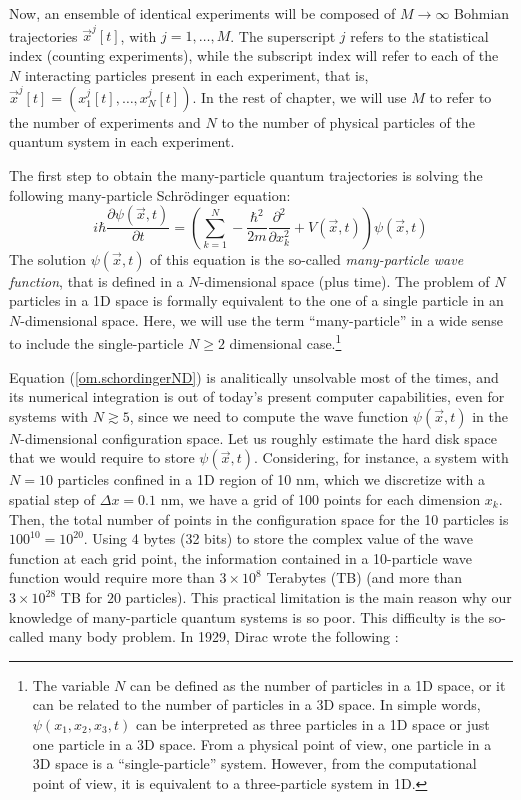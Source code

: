 \documentclass[nofootinbib, secnumarabic, amsmath, nobibnotes,10pt,aps,pra]{revtex4-1}
\newcommand{\Eref}[1]{Equation (\ref{#1})}
\begin{document}
Now, an ensemble of identical experiments  will be composed of $M\rightarrow\infty$
Bohmian trajectories $\vec{x}^j[t]$, with $j = 1,\ldots,M$. The superscript
$j$ refers to the statistical index (counting experiments), while
the subscript index will refer to each of the $N$ interacting particles present in each experiment,
that is, $\vec{x}^j[t] = (x^j_{1}[t],\ldots,x^j_{N}[t] )$. In the rest of chapter, we will use $M$ to refer to the number of experiments and $N$ to the number of physical particles of the quantum system in each experiment. 

The first step to obtain the many-particle quantum trajectories is solving the following many-particle Schr\"{o}dinger equation:
\begin{equation}
\label{om.schordingerND}
i \hbar \frac{\partial \psi(\vec{x},t)}{\partial t} = \left(\sum_{k = 1}^N -\frac{\hbar^2}{2m}\frac {\partial^2} {\partial x_k^2} + V(\vec{x},t) \right) \psi(\vec{x},t)
\end{equation}
The solution $\psi(\vec{x},t)$ of this equation is the so-called
\textit{many-particle wave function}, that is defined in a
$N$-dimensional space (plus time). The problem of $N$ particles in a
1D space is formally equivalent to the one of a single particle in
an $N$-dimensional space. Here, we will use the term ``many-particle''
in a wide sense to include the single-particle $N\geq2$
dimensional case.\footnote{The variable $N$ can be defined as the
number of particles in a 1D space, or it can be related to the
number of particles in a 3D space. In
simple words, $\psi(x_1,x_2,x_3,t)$ can be interpreted as three
particles in a 1D space or just one particle in a 3D space. From a
physical point of view, one particle in a 3D space is a
``single-particle'' system. However, from the computational point of
view, it is equivalent to a three-particle system in 1D.}

\Eref{om.schordingerND} is analitically unsolvable most of the times, and its numerical integration is out of today's present computer capabilities, even for systems with $N \gtrsim 5$, since we need to compute the wave function $\psi(\vec{x},t)$ in the $N$-dimensional configuration space.
Let us roughly estimate the hard disk space that we would require to store $\psi(\vec{x},t)$.
Considering, for instance, a system with $N = 10$ particles confined in a 1D region of 10 nm, which we discretize with a spatial step of $\Delta x = 0.1$ nm, we have a grid of 100 points for each dimension $x_k$.
Then, the total number of points in the configuration space for the 10 particles is $100^{10} = 10^{20}$.
Using 4 bytes (32 bits) to store the complex value of the wave function at each grid point, the information contained in a 10-particle wave function would require more than $3 \times 10^8$ Terabytes (TB) (and more than $3\times 10^{28}$ TB for $20$ particles).
This practical limitation is the main reason why our knowledge of many-particle quantum systems is so poor. This difficulty is the so-called many body problem. 
In 1929, Dirac wrote the following \cite{om.dirac1929bis}:\\\vspace*{-6pt}
\end{document}
